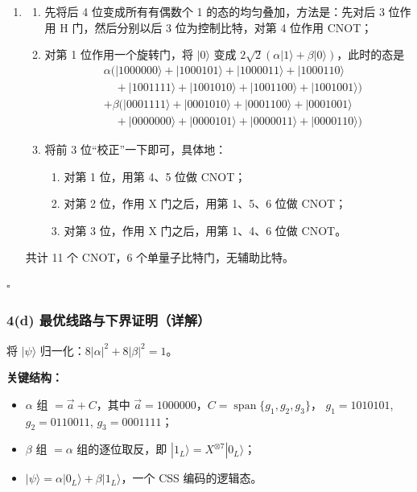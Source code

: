 \documentclass{ctexart}
\newcommand{\ket}[1]{|#1\rangle}
\begin{document}
\begin{enumerate}
    \item[(d)] \begin{enumerate}
        \item[(1)] 先将后 4 位变成所有有偶数个 1 的态的均匀叠加，方法是：先对后 3 位作用 H 门，然后分别以后 3 位为控制比特，对第 4 位作用 CNOT；
        \item[(2)] 对第 1 位作用一个旋转门，将 $\ket{0}$ 变成 $2\sqrt{2}(\alpha\ket{1} + \beta\ket{0})$，此时的态是
        \begin{align*}
            &\alpha(\ket{1000000}+\ket{1000101}+\ket{1000011}+\ket{1000110} \\
            &\quad +\ket{1001111}+\ket{1001010}+\ket{1001100}+\ket{1001001}) \\
            &+\beta(\ket{0001111}+\ket{0001010}+\ket{0001100}+\ket{0001001} \\
            &\quad +\ket{0000000}+\ket{0000101}+\ket{0000011}+\ket{0000110})
        \end{align*}
        \item[(3)] 将前 3 位“校正”一下即可，具体地：\begin{enumerate}
            \item[] 对第 1 位，用第 4、5 位做 CNOT；
            \item[] 对第 2 位，作用 X 门之后，用第 1、5、6 位做 CNOT；
            \item[] 对第 3 位，作用 X 门之后，用第 1、4、6 位做 CNOT。
        \end{enumerate}
    \end{enumerate}
    共计 11 个 CNOT，6 个单量子比特门，无辅助比特。
\end{enumerate}

\hfill $\square$

\subsubsection*{4(d) 最优线路与下界证明（详解）}

将 $|\psi\rangle$ 归一化：$8|\alpha|^2+8|\beta|^2=1$。

\textbf{关键结构：}
\begin{itemize}
    \item $\alpha$ 组 $= \vec{a}+C$，其中 $\vec{a}=1000000$，$C=\operatorname{span}\{g_1,g_2,g_3\}$，
    $g_1{=}1010101$, $g_2{=}0110011$, $g_3{=}0001111$；
    \item $\beta$ 组 $=\alpha$ 组的逐位取反，即 $|1_L\rangle = X^{\otimes 7}|0_L\rangle$；
    \item $|\psi\rangle = \alpha|0_L\rangle + \beta|1_L\rangle$，一个 CSS 编码的逻辑态。
\end{itemize}
\end{document}
